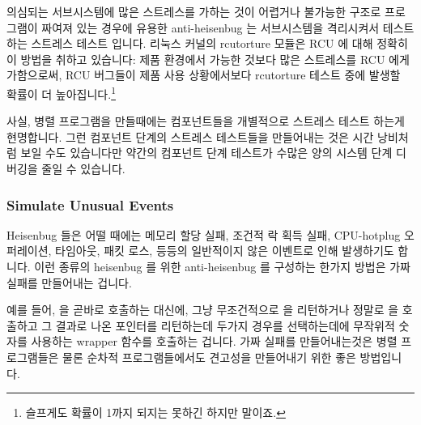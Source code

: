 의심되는 서브시스템에 많은 스트레스를 가하는 것이 어렵거나 불가능한 구조로
프로그램이 짜여져 있는 경우에 유용한 anti-heisenbug 는 서브시스템을 격리시켜서
테스트하는 스트레스 테스트 입니다.
리눅스 커널의 rcutorture 모듈은 RCU 에 대해 정확히 이 방법을 취하고 있습니다:
제품 환경에서 가능한 것보다 많은 스트레스를 RCU 에게 가함으로써, RCU 버그들이
제품 사용 상황에서보다 rcutorture 테스트 중에 발생할 확률이 더
높아집니다.\footnote{
	슬프게도 확률이 1까지 되지는 못하긴 하지만 말이죠.}

사실, 병렬 프로그램을 만들때에는 컴포넌트들을 개별적으로 스트레스 테스트 하는게
현명합니다.
그런 컴포넌트 단계의 스트레스 테스트들을 만들어내는 것은 시간 낭비처럼 보일
수도 있습니다만 약간의 컴포넌트 단계 테스트가 수많은 양의 시스템 단계 디버깅을
줄일 수 있습니다.

\subsubsection{Simulate Unusual Events}
\label{sec:debugging:Simulate Unusual Events}

Heisenbug 들은 어떨 때에는 메모리 할당 실패, 조건적 락 획득 실패, CPU-hotplug
오퍼레이션, 타임아웃, 패킷 로스, 등등의 일반적이지 않은 이벤트로 인해
발생하기도 합니다.
이런 종류의 heisenbug 를 위한 anti-heisenbug 를 구성하는 한가지 방법은 가짜
실패를 만들어내는 겁니다.

예를 들어,  을 곧바로 호출하는 대신에, 그냥 무조건적으로 
을 리턴하거나 정말로  을 호출하고 그 결과로 나온 포인터를
리턴하는데 두가지 경우를 선택하는데에 무작위적 숫자를 사용하는 wrapper 함수를
호출하는 겁니다.
가짜 실패를 만들어내는것은 병렬 프로그램들은 물론 순차적 프로그램들에서도
견고성을 만들어내기 위한 좋은 방법입니다.
\iffalse

